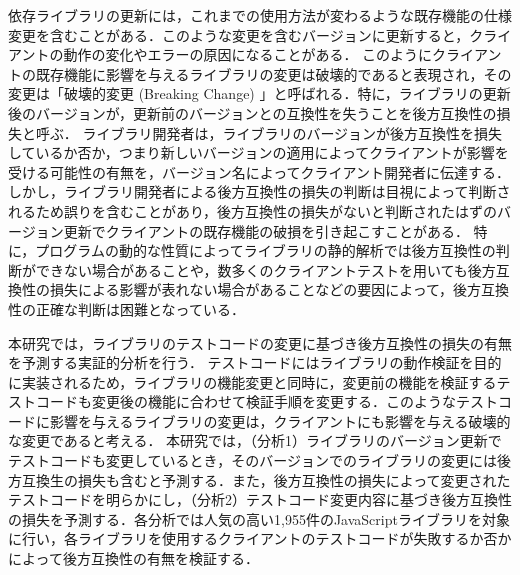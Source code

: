 \documentclass[submit]{ipsj}
\begin{document}
依存ライブラリの更新には，これまでの使用方法が変わるような既存機能の仕様変更を含むことがある．このような変更を含むバージョンに更新すると，クライアントの動作の変化やエラーの原因になることがある．
このようにクライアントの既存機能に影響を与えるライブラリの変更は破壊的であると表現され，その変更は「破壊的変更 (Breaking Change) 」と呼ばれる．特に，ライブラリの更新後のバージョンが，更新前のバージョンとの互換性を失うことを後方互換性の損失と呼ぶ．
ライブラリ開発者は，ライブラリのバージョンが後方互換性を損失しているか否か，つまり新しいバージョンの適用によってクライアントが影響を受ける可能性の有無を，バージョン名によってクライアント開発者に伝達する．
しかし，ライブラリ開発者による後方互換性の損失の判断は目視によって判断されるため誤りを含むことがあり，後方互換性の損失がないと判断されたはずのバージョン更新でクライアントの既存機能の破損を引き起こすことがある．
特に，プログラムの動的な性質によってライブラリの静的解析では後方互換性の判断ができない場合があることや，数多くのクライアントテストを用いても後方互換性の損失による影響が表れない場合があることなどの要因によって，後方互換性の正確な判断は困難となっている．

本研究では，ライブラリのテストコードの変更に基づき後方互換性の損失の有無を予測する実証的分析を行う．
テストコードにはライブラリの動作検証を目的に実装されるため，ライブラリの機能変更と同時に，変更前の機能を検証するテストコードも変更後の機能に合わせて検証手順を変更する．このようなテストコードに影響を与えるライブラリの変更は，クライアントにも影響を与える破壊的な変更であると考える．
本研究では，（分析1）ライブラリのバージョン更新でテストコードも変更しているとき，そのバージョンでのライブラリの変更には後方互換生の損失も含むと予測する．また，後方互換性の損失によって変更されたテストコードを明らかにし，（分析2）テストコード変更内容に基づき後方互換性の損失を予測する．各分析では人気の高い1,955件のJavaScriptライブラリを対象に行い，各ライブラリを使用するクライアントのテストコードが失敗するか否かによって後方互換性の有無を検証する．
\end{document}
